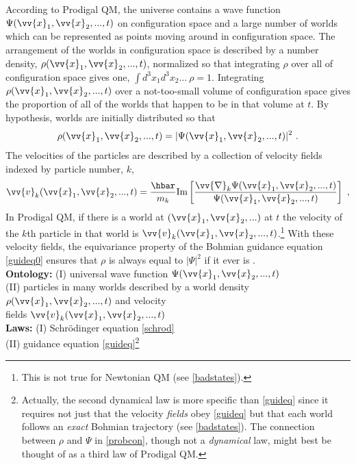 \documentclass[onecolumn,secnumarabic,balancelastpage,amsmath,amssymb,nofootinbib]{article}
\begin{document}
According to Prodigal QM, the universe contains a wave function $\Psi(\vv{x}_1,\vv{x}_2,...,t)$ on configuration space and a large number of worlds which can be represented as points moving around in configuration space.  The arrangement of the worlds in configuration space is described by a number density, $\rho(\vv{x}_1,\vv{x}_2,...,t)$, normalized so that integrating $\rho$ over all of configuration space gives one, $\int \! d^3 x_1 d^3 x_2...\: \rho=1$.  Integrating $\rho(\vv{x}_1,\vv{x}_2,...,t)$ over a not-too-small volume of configuration space gives the proportion of all of the worlds that happen to be in that volume at $t$.  By hypothesis, worlds are initially distributed so that
\begin{equation}
\rho(\vv{x}_1,\vv{x}_2,...,t)=|\Psi(\vv{x}_1,\vv{x}_2,...,t)|^2\ .
\label{probcon}
\end{equation}
The velocities of the particles are described by a collection of velocity fields indexed by particle number, $k$,
\begin{equation}
\vv{v}_k(\vv{x}_1,\vv{x}_2,...,t)=\frac{\hbar}{m_k}\mbox{Im}\left[\frac{\vv{\nabla}_k\Psi(\vv{x}_1,\vv{x}_2,...,t)}{\Psi(\vv{x}_1,\vv{x}_2,...,t)}\right]\ ,
\label{guideq}
\end{equation}
In Prodigal QM, if there is a world at $(\vv{x}_1,\vv{x}_2,...)$ at $t$ the velocity of the $k$th particle in that world is $\vv{v}_k(\vv{x}_1,\vv{x}_2,...,t)$.\footnote{This is not true for Newtonian QM (see \textsection \ref{badstates}).}  With these velocity fields, the equivariance property of the Bohmian guidance equation \eqref{guideq0} ensures that $\rho$ is always equal to $|\Psi|^2$ if it ever is \citep[see][]{durr1992}.
\vspace*{6 pt}\\\hspace*{1.2cm}\textbf{Ontology:} (I) universal wave function $\Psi(\vv{x}_1,\vv{x}_2,...,t)$
\\\hspace*{1.2cm}(II) particles in many worlds described by a world density $\rho(\vv{x}_1,\vv{x}_2,...,t)$ and velocity
\\\hspace*{1.2cm}fields $\vv{v}_k(\vv{x}_1,\vv{x}_2,...,t)$
\\\hspace*{1.2cm}\textbf{Laws:} (I) Schr\"{o}dinger equation \eqref{schrod}
\\\hspace*{1.2cm}(II) guidance equation \eqref{guideq}\footnote{Actually, the second dynamical law is more specific than \eqref{guideq} since it requires not just that the velocity \emph{fields} obey \eqref{guideq} but that each world follows an \emph{exact} Bohmian trajectory (see \textsection \ref{badstates}).  The connection between $\rho$ and $\Psi$ in \eqref{probcon}, though not a \emph{dynamical} law, might best be thought of as a third law of Prodigal QM.}\vspace*{6 pt}
\end{document}

